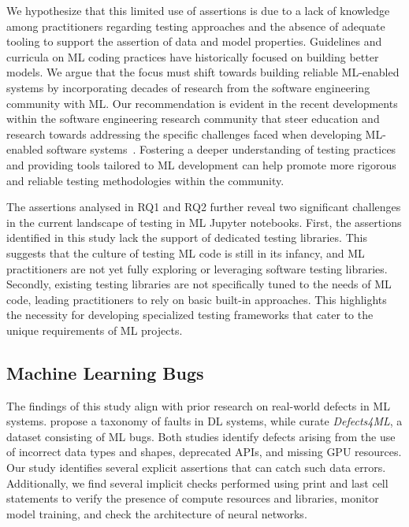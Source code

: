 \documentclass[smallextended]{svjour3}       %
\begin{document}
We hypothesize that this limited use of assertions is due to a lack of knowledge among practitioners regarding testing approaches and the absence of adequate tooling to support the assertion of data and model properties. Guidelines and curricula on ML coding practices have historically focused on building better models. We argue that the focus must shift towards building reliable ML-enabled systems by incorporating decades of research from the software engineering community with ML. Our recommendation is evident in the recent developments within the software engineering research community that steer education and research towards addressing the specific challenges faced when developing ML-enabled software systems~\citep{kastner2020teaching}. Fostering a deeper understanding of testing practices and providing tools tailored to ML development can help promote more rigorous and reliable testing methodologies within the community.

The assertions analysed in RQ1 and RQ2 further reveal two significant challenges in the current landscape of testing in ML Jupyter notebooks. First, the assertions identified in this study lack the support of dedicated testing libraries. This suggests that the culture of testing ML code is still in its infancy, and ML practitioners are not yet fully exploring or leveraging software testing libraries. Secondly, existing testing libraries are not specifically tuned to the needs of ML code, leading practitioners to rely on basic built-in approaches. This highlights the necessity for developing specialized testing frameworks that cater to the unique requirements of ML projects.

\subsection{Machine Learning Bugs}

The findings of this study align with prior research on real-world defects in ML systems. \citet{humbatova2020taxonomy} propose a taxonomy of faults in DL systems, while \citet{morovati2023bugs} curate \emph{Defects4ML}, a dataset consisting of ML bugs. Both studies identify defects arising from the use of incorrect data types and shapes, deprecated APIs, and missing GPU resources. Our study identifies several explicit assertions that can catch such data errors. Additionally, we find several implicit checks performed using print and last cell statements to verify the presence of compute resources and libraries, monitor model training, and check the architecture of neural networks.
\end{document}
